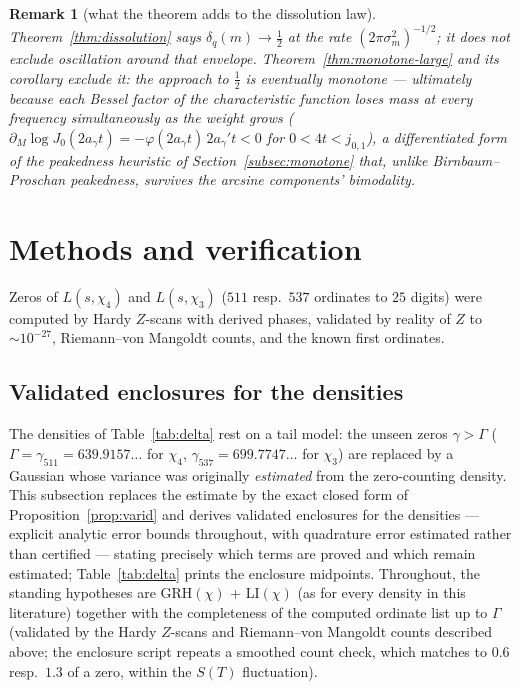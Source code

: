 \documentclass[11pt]{article}
\newtheorem{remark}{Remark}
\begin{document}
\begin{remark}[what the theorem adds to the dissolution law]
Theorem~\ref{thm:dissolution} says $\delta_q(m)\to\tfrac12$ at the
rate $(2\pi\sigma_m^2)^{-1/2}$; it does not exclude oscillation
around that envelope. Theorem~\ref{thm:monotone-large} and its
corollary exclude it: the approach to $\tfrac12$ is eventually
monotone --- ultimately because each Bessel factor of the
characteristic function loses mass at every frequency
simultaneously as the weight grows
($\partial_M\log J_0(2a_\gamma t)=-\varphi(2a_\gamma t)\,
2a_\gamma't<0$ for $0<4t<j_{0,1}$), a differentiated form of the
peakedness heuristic of Section~\ref{subsec:monotone} that, unlike
Birnbaum--Proschan peakedness, survives the arcsine components'
bimodality.
\end{remark}


\section{Methods and verification}\label{sec:methods}

Zeros of $L(s,\chi_4)$ and $L(s,\chi_3)$ ($511$ resp.\ $537$ ordinates
to $25$ digits) were computed by Hardy $Z$-scans with derived phases,
validated by reality of $Z$ to $\sim10^{-27}$, Riemann--von Mangoldt
counts, and the known first ordinates.

\subsection*{Validated enclosures for the densities}
\label{subsec:certified}

The densities of Table~\ref{tab:delta} rest on a tail model:
the unseen zeros $\gamma>\Gamma$ ($\Gamma=\gamma_{511}=639.9157\ldots$
for $\chi_4$, $\gamma_{537}=699.7747\ldots$ for $\chi_3$) are replaced
by a Gaussian whose variance was originally \emph{estimated} from the
zero-counting density. This subsection replaces the estimate by the
exact closed form of Proposition~\ref{prop:varid} and derives
validated enclosures for the densities --- explicit analytic error
bounds throughout, with quadrature error estimated rather than
certified --- stating precisely which terms are proved and which
remain estimated; Table~\ref{tab:delta} prints the enclosure
midpoints. Throughout, the standing hypotheses are
GRH$(\chi)$ + LI$(\chi)$ (as for every density in this literature)
together with the completeness of the computed ordinate list up to
$\Gamma$ (validated by the Hardy $Z$-scans and Riemann--von Mangoldt
counts described above; the enclosure script repeats a smoothed count
check, which matches to $0.6$ resp.\ $1.3$ of a zero, within the
$S(T)$ fluctuation).
\end{document}

